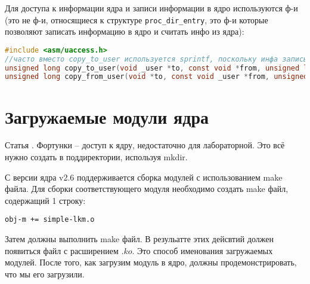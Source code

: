  

Для доступа к информации ядра и записи информации в ядро используются ф-и (это не ф-и, относящиеся к структуре \verb|proc_dir_entry|, это ф-и которые позволяют записать информацию в ядро и считать инфо из ядра):
\begin{lstlisting}[language=c]
#include <asm/uaccess.h>
//часто вместо copy_to_user используется sprintf, поскольку инфа записывается в буфер 
unsigned long copy_to_user(void _user *to, const void *from, unsigned long n); 
unsigned long copy_from_user(void *to, const void _user *from, unsigned long n);
\end{lstlisting}

\section{Загружаемые модули ядра}
Статья \cite{IBM_lproc}. 
Фортунки – доступ к ядру, недостаточно для лабораторной. Это всё нужно создать в поддиректории, используя mkdir.

С версии ядра v2.6 поддерживается сборка модулей с использованием make файла. Для сборки соответствующего модуля необходимо создать make файл, содержащий 1 строку: 
\begin{lstlisting}[label=proc_mkdir, caption=make file]
obj-m += simple-lkm.o
\end{lstlisting}

Затем должны выполнить make файл. В резульатте этих дейсвтий должен появиться файл с расширением $.ko$. Это способ именования загружаемых модулей. После того, как загрузим модуль в ядро, должны продемонстрировать, что мы его загрузили.